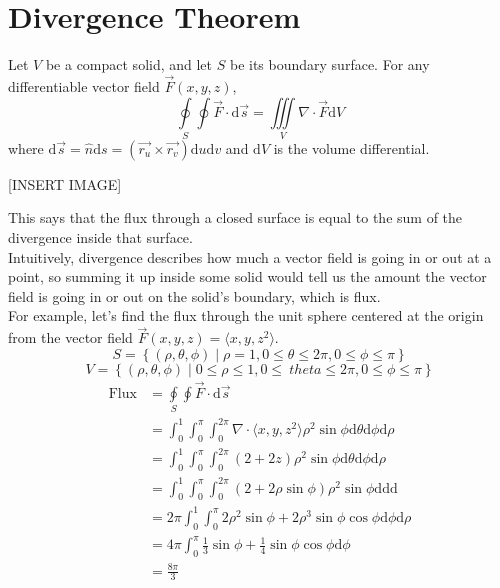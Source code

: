 \section{Divergence Theorem}
\begin{theorem}
	Let $V$ be a compact solid, and let $S$ be its boundary surface. For any differentiable vector field $\vec{F}(x,y,z)$,
	\begin{equation*}
		\oint\limits_{S}{\oint{\vec{F} \cdot \mathrm{d}\vec{s}}} = \iiint\limits_{V}{\nabla \cdot \vec{F}\mathrm{d}V}
	\end{equation*}
	where $\mathrm{d}\vec{s} = \hat{n}\mathrm{d}s = (\vec{r_u}\times\vec{r_v})\mathrm{d}u\mathrm{d}v$ and $\mathrm{d}V$ is the volume differential.
\end{theorem}

[INSERT IMAGE]

\noindent
This says that the flux through a closed surface is equal to the sum of the divergence inside that surface.\\
Intuitively, divergence describes how much a vector field is going in or out at a point, so summing it up inside some solid would tell us the amount the vector field is going in or out on the solid’s boundary, which is flux.\\

\noindent
For example, let’s find the flux through the unit sphere centered at the origin from the vector field $\vec{F}(x,y,z) = \langle x, y, z^2 \rangle$.
\begin{equation*}
	S = \left\{(\rho, \theta, \phi) \mid \rho=1, 0 \leq \theta \leq 2\pi, 0 \leq \phi \leq \pi \right\}
\end{equation*}
\begin{equation*}
	V = \left\{(\rho, \theta, \phi) \mid 0 \leq \rho \leq 1, 0 \leq\ theta \leq 2\pi, 0 \leq \phi \leq \pi \right\}
\end{equation*}
\begin{align*}
	\text{Flux} &= \oint\limits_{S}{\oint{\vec{F} \cdot \mathrm{d}\vec{s}}}	\\
	&= \int_{0}^{1}{\int_{0}^{\pi}{\int_{0}^{2\pi}{\nabla \cdot \langle x, y, z^2 \rangle\rho^2\sin{\phi}\mathrm{d}\theta}\mathrm{d}\phi}\mathrm{d}\rho} \\
	&= \int_{0}^{1}{\int_{0}^{\pi}{\int_{0}^{2\pi}{(2 + 2z)\rho^2\sin{\phi}\mathrm{d}\theta}\mathrm{d}\phi}\mathrm{d}\rho} \\
	&= \int_{0}^{1}{\int_{0}^{\pi}{\int_{0}^{2\pi}{(2 + 2\rho\sin{\phi})\rho^2\sin{\phi}\mathrm{d}}\mathrm{d}}\mathrm{d}} \\
	&= 2\pi\int_{0}^{1}{\int_{0}^{\pi}{2\rho^2\sin{\phi} + 2\rho^3\sin{\phi}\cos{\phi}\mathrm{d}\phi}\mathrm{d}\rho} \\
	&= 4\pi\int_{0}^{\pi}{\frac{1}{3}\sin{\phi} + \frac{1}{4}\sin{\phi}\cos{\phi}\mathrm{d}\phi} \\
	&= \frac{8\pi}{3}
\end{align*}


